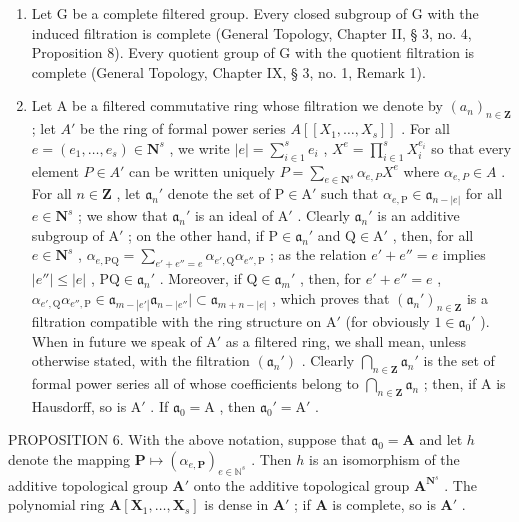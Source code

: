 \begin{enumerate}
\def\labelenumi{(\arabic{enumi})}
\item
  Let G be a complete filtered group. Every closed subgroup of G with the induced filtration is complete (General Topology, Chapter II, § 3, no. 4, Proposition 8). Every quotient group of G with the quotient filtration is complete (General Topology, Chapter IX, § 3, no. 1, Remark 1).
\item
  Let A be a filtered commutative ring whose filtration we denote by \((a_n)_{n\in \mathbf{Z}}\) ; let \(A'\) be the ring of formal power series \(A[[X_1,\ldots ,X_s]]\) . For all \(e = (e_1,\dots ,e_s)\in \mathbf{N}^s\) , we write \(|e| = \sum_{i\in 1}^{s}e_i\) , \(X^e = \prod_{i\in 1}^{s}X_i^{e_i}\) so that every element \(P\in A'\) can be written uniquely \(P = \sum_{e\in \mathbf{N}^s}\alpha_{e,P}X^e\) where \(\alpha_{e,P}\in A\) . For all \(n\in \mathbf{Z}\) , let \(\mathfrak{a}_n'\) denote the set of \(\mathrm{P} \in \mathrm{A}'\) such that \(\alpha_{e,\mathrm{P}} \in \mathfrak{a}_{n-|e|}\) for all \(e \in \mathbf{N}^s\) ; we show that \(\mathfrak{a}_n'\) is an ideal of \(\mathrm{A}'\) . Clearly \(\mathfrak{a}_n'\) is an additive subgroup of \(\mathrm{A}'\) ; on the other hand, if \(\mathrm{P} \in \mathfrak{a}_n'\) and \(\mathrm{Q} \in \mathrm{A}'\) , then, for all \(e \in \mathbf{N}^s\) , \(\alpha_{e,\mathrm{PQ}} = \sum_{e' + e'' = e} \alpha_{e',\mathrm{Q}} \alpha_{e'',\mathrm{P}}\) ; as the relation \(e' + e'' = e\) implies \(|e''| \leqslant |e|\) , \(\mathrm{PQ} \in \mathfrak{a}_n'\) . Moreover, if \(\mathrm{Q} \in \mathfrak{a}_m'\) , then, for \(e' + e'' = e\) , \(\alpha_{e',\mathrm{Q}} \alpha_{e'',\mathrm{P}} \in \mathfrak{a}_{m-|e'|} \mathfrak{a}_{n-|e''}| \subset \mathfrak{a}_{m+n-|e|}\) , which proves that \((\mathfrak{a}_n')_{n \in \mathbf{Z}}\) is a filtration compatible with the ring structure on \(\mathrm{A}'\) (for obviously \(1 \in \mathfrak{a}_0'\) ). When in future we speak of \(\mathrm{A}'\) as a filtered ring, we shall mean, unless otherwise stated, with the filtration \((\mathfrak{a}_n')\) . Clearly \(\bigcap_{n \in \mathbf{Z}} \mathfrak{a}_n'\) is the set of formal power series all of whose coefficients belong to \(\bigcap_{n \in \mathbf{Z}} \mathfrak{a}_n\) ; then, if A is Hausdorff, so is \(\mathrm{A}'\) . If \(\mathfrak{a}_0 = \mathrm{A}\) , then \(\mathfrak{a}_0' = \mathrm{A}'\) .
\end{enumerate}

PROPOSITION 6. With the above notation, suppose that \(\mathfrak{a}_0 = \mathbf{A}\) and let \(h\) denote the mapping \(\mathbf{P} \mapsto (\alpha_{e,\mathbf{P}})_{e \in \mathbb{N}^s}\) . Then \(h\) is an isomorphism of the additive topological group \(\mathbf{A}'\) onto the additive topological group \(\mathbf{A}^{\mathbf{N}^s}\) . The polynomial ring \(\mathbf{A}[\mathbf{X}_1, \ldots, \mathbf{X}_s]\) is dense in \(\mathbf{A}'\) ; if \(\mathbf{A}\) is complete, so is \(\mathbf{A}'\) .

